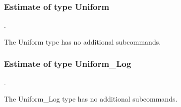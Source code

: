 
\subsubsection{Estimate of type Uniform}
.
\label{syntax:Estimate-Uniform}

The Uniform type has no additional subcommands.
\subsubsection{Estimate of type Uniform\_Log}
.
\label{syntax:Estimate-UniformLog}

The Uniform\_Log type has no additional subcommands.
